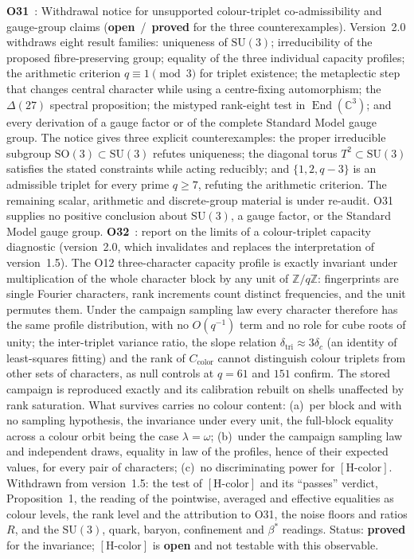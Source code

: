 \documentclass[11pt,a4paper]{article}
\newcommand{\SU}{\mathrm{SU}}
\newcommand{\sproved}{\textcolor{cproved}{\textbf{proved}}}
\newcommand{\sopen}{\textcolor{copen}{\textbf{open}}}
\begin{document}
    \textbf{O31}~\cite{Beau2026a35}: Withdrawal notice for unsupported colour-triplet
    co-admissibility and gauge-group claims (\sopen\ /\ \sproved{} for the three counterexamples).
    Version~2.0 withdraws eight result families: uniqueness of $\SU(3)$; irreducibility of the
    proposed fibre-preserving group; equality of the three individual capacity profiles; the
    arithmetic criterion $q\equiv1\pmod3$ for triplet existence; the metaplectic step that changes
    central character while using a centre-fixing automorphism; the $\Delta(27)$ spectral
    proposition; the mistyped rank-eight test in $\operatorname{End}(\mathbb C^3)$; and every
    derivation of a gauge factor or of the complete Standard Model gauge group.
    The notice gives three explicit counterexamples: the proper irreducible subgroup
    $\mathrm{SO}(3)\subset\SU(3)$ refutes uniqueness; the diagonal torus $T^2\subset\SU(3)$
    satisfies the stated constraints while acting reducibly; and
    $\{1,2,q-3\}$ is an admissible triplet for every prime $q\ge7$, refuting the arithmetic
    criterion. The remaining scalar, arithmetic and discrete-group material is under re-audit.
    O31 supplies no positive conclusion about $\SU(3)$, a gauge factor, or the Standard Model
    gauge group.
    \textbf{O32}~\cite{Beau2026a36}: report on the limits of a colour-triplet capacity diagnostic
    (version~2.0, which invalidates and replaces the interpretation of version~1.5).
    The O12 three-character capacity profile is exactly invariant under multiplication of the whole
    character block by any unit of $\mathbb{Z}/q\mathbb{Z}$: fingerprints are single Fourier characters,
    rank increments count distinct frequencies, and the unit permutes them.
    Under the campaign sampling law every character therefore has the same profile distribution, with no
    $O(q^{-1})$ term and no role for cube roots of unity; the inter-triplet variance ratio, the slope relation
    $\delta_{\mathrm{tri}}\approx3\delta_c$ (an identity of least-squares fitting) and the rank of
    $C_{\mathrm{color}}$ cannot distinguish colour triplets from other sets of characters, as null controls
    at $q = 61$ and $151$ confirm.
    The stored campaign is reproduced exactly and its calibration rebuilt on shells unaffected by rank
    saturation.
    What survives carries no colour content: (a)~per block and with no sampling hypothesis, the invariance
    under every unit, the full-block equality across a colour orbit being the case $\lambda=\omega$;
    (b)~under the campaign sampling law and independent draws, equality in law of the profiles, hence of
    their expected values, for every pair of characters; (c)~no discriminating power for
    $[\mathrm{H\text{-}color}]$.
    Withdrawn from version~1.5: the test of $[\mathrm{H\text{-}color}]$ and its ``passes'' verdict, Proposition~1,
    the reading of the pointwise, averaged and effective equalities as colour levels, the rank level and the
    attribution to O31, the noise floors and ratios $R$, and the $\mathrm{SU}(3)$, quark, baryon,
    confinement and $\beta^*$ readings.
    Status: \sproved{} for the invariance; $[\mathrm{H\text{-}color}]$ is \sopen{} and not testable with this
    observable.
\end{document}
